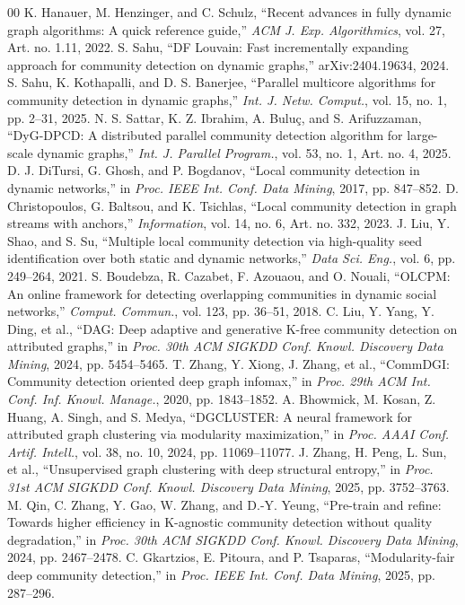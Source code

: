 \documentclass[conference]{IEEEtran}
\theoremstyle{definition}
\begin{document}
\begin{thebibliography}{00}
    K. Hanauer, M. Henzinger, and C. Schulz, ``Recent advances in fully dynamic graph algorithms: A quick reference guide,'' \textit{ACM J. Exp. Algorithmics}, vol. 27, Art. no. 1.11, 2022.
    S. Sahu, ``DF Louvain: Fast incrementally expanding approach for community detection on dynamic graphs,'' arXiv:2404.19634, 2024.
    S. Sahu, K. Kothapalli, and D. S. Banerjee, ``Parallel multicore algorithms for community detection in dynamic graphs,'' \textit{Int. J. Netw. Comput.}, vol. 15, no. 1, pp. 2--31, 2025.
    N. S. Sattar, K. Z. Ibrahim, A. Bulu{\c c}, and S. Arifuzzaman, ``DyG-DPCD: A distributed parallel community detection algorithm for large-scale dynamic graphs,'' \textit{Int. J. Parallel Program.}, vol. 53, no. 1, Art. no. 4, 2025.
    D. J. DiTursi, G. Ghosh, and P. Bogdanov, ``Local community detection in dynamic networks,'' in \textit{Proc. IEEE Int. Conf. Data Mining}, 2017, pp. 847--852.
    D. Christopoulos, G. Baltsou, and K. Tsichlas, ``Local community detection in graph streams with anchors,'' \textit{Information}, vol. 14, no. 6, Art. no. 332, 2023.
    J. Liu, Y. Shao, and S. Su, ``Multiple local community detection via high-quality seed identification over both static and dynamic networks,'' \textit{Data Sci. Eng.}, vol. 6, pp. 249--264, 2021.
    S. Boudebza, R. Cazabet, F. Azouaou, and O. Nouali, ``OLCPM: An online framework for detecting overlapping communities in dynamic social networks,'' \textit{Comput. Commun.}, vol. 123, pp. 36--51, 2018.
    C. Liu, Y. Yang, Y. Ding, et al., ``DAG: Deep adaptive and generative K-free community detection on attributed graphs,'' in \textit{Proc. 30th ACM SIGKDD Conf. Knowl. Discovery Data Mining}, 2024, pp. 5454--5465.
    T. Zhang, Y. Xiong, J. Zhang, et al., ``CommDGI: Community detection oriented deep graph infomax,'' in \textit{Proc. 29th ACM Int. Conf. Inf. Knowl. Manage.}, 2020, pp. 1843--1852.
    A. Bhowmick, M. Kosan, Z. Huang, A. Singh, and S. Medya, ``DGCLUSTER: A neural framework for attributed graph clustering via modularity maximization,'' in \textit{Proc. AAAI Conf. Artif. Intell.}, vol. 38, no. 10, 2024, pp. 11069--11077.
    J. Zhang, H. Peng, L. Sun, et al., ``Unsupervised graph clustering with deep structural entropy,'' in \textit{Proc. 31st ACM SIGKDD Conf. Knowl. Discovery Data Mining}, 2025, pp. 3752--3763.
    M. Qin, C. Zhang, Y. Gao, W. Zhang, and D.-Y. Yeung, ``Pre-train and refine: Towards higher efficiency in K-agnostic community detection without quality degradation,'' in \textit{Proc. 30th ACM SIGKDD Conf. Knowl. Discovery Data Mining}, 2024, pp. 2467--2478.
    C. Gkartzios, E. Pitoura, and P. Tsaparas, ``Modularity-fair deep community detection,'' in \textit{Proc. IEEE Int. Conf. Data Mining}, 2025, pp. 287--296.
\end{thebibliography}
\endgroup
\end{document}
